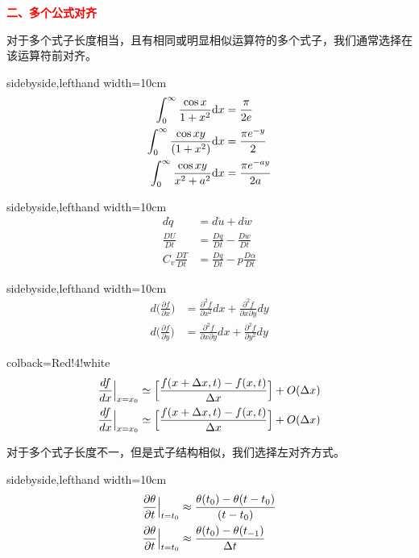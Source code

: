\documentclass[UTF8,
no-math,
12pt,
openany,
table,
dvipsnames,
svgnames]{article}
\renewcommand{\d}{{\rm d}}
\begin{document}
\noindent
{\large\bf{\textcolor{Red}{二、多个公式对齐}}}


对于多个式子长度相当，且有相同或明显相似运算符的多个式子，我们通常选择在该运算符前对齐。

\begin{tcblisting}{sidebyside,lefthand width=10cm}
\begin{align*}
\int_0^{\infty} \dfrac{\cos x}{1+x^2}\d x & =\frac{\pi}{2 e} \\
\int_0^{\infty} \dfrac{\cos x y}{\left(1+x^2\right)} \d x & =\dfrac{\pi e^{-y}}{2} \\
\int_0^{\infty} \dfrac{\cos x y}{x^2+a^2} \d x & =\frac{\pi e^{-a y}}{2 a}
\end{align*}
\end{tcblisting}

\begin{tcblisting}{sidebyside,lefthand width=10cm}
\begin{align*}
d\dot{q}     &=d\dot{u}+d\dot{w}  \\
\frac{DU}{Dt}&=\frac{Dq}{Dt}-\frac{Dw}{Dt}\\
C_v\frac{DT}{Dt}&=\frac{Dq}{Dt}-p\frac{D\alpha}{Dt}
\end{align*}
\end{tcblisting}

\begin{tcblisting}{sidebyside,lefthand width=10cm}
\begin{align*}
d\Big(\frac{\partial f}{\partial x}\Big) &=\frac{\partial^2 f}{\partial x^2}dx + \frac{\partial^2 f}{\partial x \partial y}dy \\
d\Big(\frac{\partial f}{\partial y}\Big) &=\frac{\partial^2 f}{\partial x \partial y}dx + \frac{\partial^2 f}{\partial y^2}dy 
\end{align*}
\end{tcblisting}


\begin{tcblisting}{colback=Red!4!white}
\begin{align*}
   \frac{df}{dx}\Big{|}_{x=x_0} & \simeq \Big[\frac{f(x + \Delta x,t) - f(x,t)}{\Delta x}\Big] + O(\Delta x)\\
   \frac{df}{dx}\Big{|}_{x=x_0} & \simeq \Big[\frac{f(x + \Delta x,t) - f(x,t)}{\Delta x}\Big] + O(\Delta x)
\end{align*}
\end{tcblisting}

对于多个式子长度不一，但是式子结构相似，我们选择左对齐方式。


\begin{tcblisting}{sidebyside,lefthand width=10cm}
\begin{align*}
& \frac{\partial \theta}{\partial t}\Big{|}_{t=t_0} \approx \frac{\theta(t_0)-\theta(t-t_0)}{(t-t_0)}\\
& \frac{\partial \theta}{\partial t}\Big{|}_{t=t_0} \approx \frac{\theta(t_0)-\theta(t_{-1})}{\Delta t}
\end{align*}
\end{tcblisting}
\end{document}
